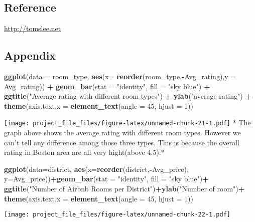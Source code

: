 \documentclass[]{article}
\newenvironment{Shaded}{\begin{snugshade}}{\end{snugshade}}
\newcommand{\KeywordTok}[1]{\textcolor[rgb]{0.13,0.29,0.53}{\textbf{#1}}}
\newcommand{\DataTypeTok}[1]{\textcolor[rgb]{0.13,0.29,0.53}{#1}}
\newcommand{\DecValTok}[1]{\textcolor[rgb]{0.00,0.00,0.81}{#1}}
\newcommand{\StringTok}[1]{\textcolor[rgb]{0.31,0.60,0.02}{#1}}
\newcommand{\OperatorTok}[1]{\textcolor[rgb]{0.81,0.36,0.00}{\textbf{#1}}}
\newcommand{\NormalTok}[1]{#1}
\begin{document}
\subsection{Reference}\label{reference}

\url{http://tomslee.net}

\subsection{Appendix}\label{appendix}

\begin{Shaded}
\begin{Highlighting}[]
\KeywordTok{ggplot}\NormalTok{(}\DataTypeTok{data =}\NormalTok{ room_type, }\KeywordTok{aes}\NormalTok{(}\DataTypeTok{x=} \KeywordTok{reorder}\NormalTok{(room_type,}\OperatorTok{-}\NormalTok{Avg_rating),}\DataTypeTok{y =}\NormalTok{ Avg_rating)) }\OperatorTok{+}\StringTok{ }\KeywordTok{geom_bar}\NormalTok{(}\DataTypeTok{stat =} \StringTok{"identity"}\NormalTok{, }\DataTypeTok{fill =} \StringTok{"sky blue"}\NormalTok{) }\OperatorTok{+}\StringTok{ }\KeywordTok{ggtitle}\NormalTok{(}\StringTok{"Average rating with different room types"}\NormalTok{) }\OperatorTok{+}\StringTok{ }\KeywordTok{ylab}\NormalTok{(}\StringTok{"average rating"}\NormalTok{) }\OperatorTok{+}\StringTok{ }\KeywordTok{theme}\NormalTok{(}\DataTypeTok{axis.text.x =} \KeywordTok{element_text}\NormalTok{(}\DataTypeTok{angle =} \DecValTok{45}\NormalTok{, }\DataTypeTok{hjust =} \DecValTok{1}\NormalTok{))}
\end{Highlighting}
\end{Shaded}

\texttt{[image: project\_file\_files/figure-latex/unnamed-chunk-21-1.pdf]}
* The graph above shows the average rating with different room types.
However we can't tell any difference among those three types. This is
because the overall rating in Boston area are all very hight(above
4.5).*

\begin{Shaded}
\begin{Highlighting}[]
\KeywordTok{ggplot}\NormalTok{(}\DataTypeTok{data=}\NormalTok{district, }\KeywordTok{aes}\NormalTok{(}\DataTypeTok{x=}\KeywordTok{reorder}\NormalTok{(district,}\OperatorTok{-}\NormalTok{Avg_price), }\DataTypeTok{y=}\NormalTok{Avg_price))}\OperatorTok{+}\KeywordTok{geom_bar}\NormalTok{(}\DataTypeTok{stat =} \StringTok{"identity"}\NormalTok{, }\DataTypeTok{fill =} \StringTok{"sky blue"}\NormalTok{)}\OperatorTok{+}
\KeywordTok{ggtitle}\NormalTok{(}\StringTok{"Number of Airbnb Rooms per District"}\NormalTok{)}\OperatorTok{+}\KeywordTok{ylab}\NormalTok{(}\StringTok{"Number of room"}\NormalTok{)}\OperatorTok{+}\StringTok{ }\KeywordTok{theme}\NormalTok{(}\DataTypeTok{axis.text.x =} \KeywordTok{element_text}\NormalTok{(}\DataTypeTok{angle =} \DecValTok{45}\NormalTok{, }\DataTypeTok{hjust =} \DecValTok{1}\NormalTok{))}
\end{Highlighting}
\end{Shaded}

\texttt{[image: project\_file\_files/figure-latex/unnamed-chunk-22-1.pdf]}
\end{document}

